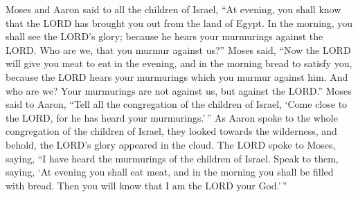  Moses and Aaron said to all the children of Israel, ``At
evening, you shall know that the LORD has brought you out from the land
of Egypt.  In the morning, you shall see the LORD's glory;
because he hears your murmurings against the LORD. Who are we, that you
murmur against us?''  Moses said, ``Now the LORD will give
you meat to eat in the evening, and in the morning bread to satisfy you,
because the LORD hears your murmurings which you murmur against him. And
who are we? Your murmurings are not against us, but against the LORD.''
 Moses said to Aaron, ``Tell all the congregation of the
children of Israel, `Come close to the LORD, for he has heard your
murmurings.'\,''  As Aaron spoke to the whole
congregation of the children of Israel, they looked towards the
wilderness, and behold, the LORD's glory appeared in the cloud.
 The LORD spoke to Moses, saying,  ``I
have heard the murmurings of the children of Israel. Speak to them,
saying, `At evening you shall eat meat, and in the morning you shall be
filled with bread. Then you will know that I am the LORD your God.'\,''

